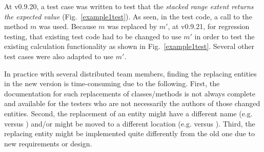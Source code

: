 At v0.9.20, a test case was written to test that the {\em stacked
range extent returns the expected value}
(Fig.~\ref{example1test}). As seen, in the test code, a call to the
method $m$ was used. Because $m$ was replaced by $m'$, at v0.9.21, for
regression testing, that existing test code had to be changed to use
$m'$ in order to test the existing calculation functionality as shown
in Fig.~\ref{example1test}. Several other test cases were also adapted to
use $m'$.




In practice 
with several distributed team members, finding the replacing entities
in the new version is time-consuming due to the following. First, the
documentation for such replacements of classes/methods is not always
complete and available for the testers who are not necessarily the
authors of those changed entities. Second, the replacement of an
entity might have a different name (e.g. 
versus ) and/or might be moved to a
different location (e.g.  versus
). Third, the replacing entity
might be implemented quite differently from the old one due to new
requirements or design.


